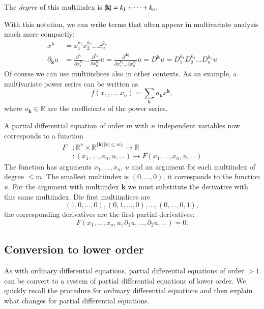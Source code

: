 \begin{definition}
The {\em degree} of this multiindex is $|{\bf k}|=k_1+\dots+k_n$.
\end{definition}
With this notation, we can write terms that often appear in multivariate
analysis much more compactly:
\begin{align*}
x^{\mathbf k}&=x_1^{k_1}x_2^{k_2}\dots x_n^{k_n}\\
\partial_{\mathbf k}u
&=\frac{\partial^{k_1}}{\partial x_1^{k_1}}\dots
\frac{\partial^{k_n}}{\partial x_n^{k_n}}u
=\frac{\partial^{|{\mathbf k}|}}{\partial x_1^{k_1}\dots\partial x_n^{k_n}}u
=D^{\mathbf k}u=D_1^{k_1}D_2^{k_2}\dots D_n^{k_n}u
\end{align*}
Of course we can use multiindices also in other contexts.
As an example, a multivariate power series can be written as
\[
f(x_1,\dots,x_n)=\sum_{\mathbf k}a_{\mathbf k}x^{\mathbf k},
\]
where $a_{\mathbf k}\in\mathbb R$ are the coefficients of the power series.

A partial differential equation of order $m$ with $n$ independent variables
now corresponds to a function
\begin{align*}
F&\colon \mathbb R^n\times \mathbb R^{\{{\mathbf k}|\,|{\mathbf k}|\le m\}} \to \mathbb R
\\
&\colon(x_1,\dots,x_n,u, \dots)\mapsto F(x_1,\dots,x_n,u,\dots)
\end{align*}
The function has arguments $x_1,\dots,x_n$, $u$ and an argument for
each multiindex of degree $\le m$.
The smallest multiindex is
$(0,\dots,0)$, it corresponds to the function $u$.
For the argument with
multiindex ${\mathbf k}$ we must substitute the derivative with
this same multiindex.
Die first multiindices are
\[
(1,0,\dots,0), (0,1,\dots,0),\dots, (0,\dots, 0,1),
\]
the corresponding derivatives are the first partial derivatives:
\[
F(x_1,\dots,x_n,u,\partial_1 u,\dots,\partial_2 u,\dots)=0.
\]

\subsection{Conversion to lower order\label{klassifikation:umwandlung}}
As with ordinary differential equations, partial differential equations
of order $>1$ can be convert to a system of partial differential equations
of lower order.
We quickly recall the procedure for ordinary differential equations
and then explain what changes for partial differential equations.

